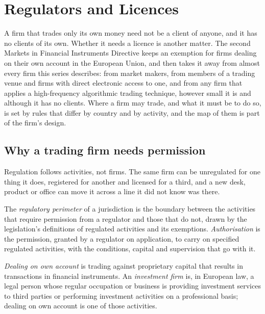 \chapter{Regulators and Licences}\label{ch:fm:regulators-and-licences}

A firm that trades only its own money need not be a client of anyone, and it has no clients of its own. Whether it needs a licence is another
matter. The second Markets in Financial Instruments Directive keeps an exemption for firms dealing on their own account in the European Union,
and then takes it away from almost every firm this series describes: from market makers, from members of a trading venue and firms with direct
electronic access to one, and from any firm that applies a high-frequency algorithmic trading technique, however small it is and although it has
no clients. Where a firm may trade, and what it must be to do so, is set by rules that differ by country and by activity, and the map of
them is part of the firm's design.

\section{Why a trading firm needs permission}

Regulation follows activities, not firms. The same firm can be unregulated for one thing it does, registered for another and licensed for a third,
and a new desk, product or office can move it across a line it did not know was there.

\begin{definition}\label{def:fm:regulators-and-licences:perimeter}
The \emph{regulatory perimeter} of a jurisdiction is the boundary between the activities that require permission from
a regulator and those that do not, drawn by the legislation's definitions of regulated activities and its exemptions. \emph{Authorisation}
is the permission, granted by a regulator on application, to carry on specified regulated activities, with the conditions, capital and
supervision that go with it.
\end{definition}

\begin{definition}\label{def:fm:regulators-and-licences:own}
\emph{Dealing on own account} is trading against proprietary capital that results in transactions in financial
instruments. An \emph{investment firm} is, in European law, a legal person whose regular occupation or business is providing
investment services to third parties or performing investment activities on a professional basis; dealing on own account is one of those
activities.
\end{definition}

